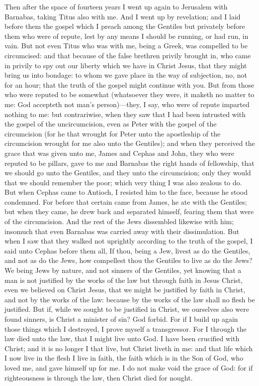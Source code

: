 Then after the space of fourteen years I went up again to Jerusalem with Barnabas, taking Titus also with me. And I went up by revelation; and I laid before them the gospel which I preach among the Gentiles but privately before them who were of repute, lest by any means I should be running, or had run, in vain. But not even Titus who was with me, being a Greek, was compelled to be circumcised: and that because of the false brethren privily brought in, who came in privily to spy out our liberty which we have in Christ Jesus, that they might bring us into bondage: to whom we gave place in the way of subjection, no, not for an hour; that the truth of the gospel might continue with you. But from those who were reputed to be somewhat (whatsoever they were, it maketh no matter to me: God accepteth not man’s person)—they, I say, who were of repute imparted nothing to me: but contrariwise, when they saw that I had been intrusted with the gospel of the uncircumcision, even as Peter with the gospel of the circumcision (for he that wrought for Peter unto the apostleship of the circumcision wrought for me also unto the Gentiles); and when they perceived the grace that was given unto me, James and Cephas and John, they who were reputed to be pillars, gave to me and Barnabas the right hands of fellowship, that we should go unto the Gentiles, and they unto the circumcision; only they would that we should remember the poor; which very thing I was also zealous to do.  But when Cephas came to Antioch, I resisted him to the face, because he stood condemned. For before that certain came from James, he ate with the Gentiles; but when they came, he drew back and separated himself, fearing them that were of the circumcision. And the rest of the Jews dissembled likewise with him; insomuch that even Barnabas was carried away with their dissimulation. But when I saw that they walked not uprightly according to the truth of the gospel, I said unto Cephas before them all, If thou, being a Jew, livest as do the Gentiles, and not as do the Jews, how compellest thou the Gentiles to live as do the Jews? We being Jews by nature, and not sinners of the Gentiles, yet knowing that a man is not justified by the works of the law but through faith in Jesus Christ, even we believed on Christ Jesus, that we might be justified by faith in Christ, and not by the works of the law: because by the works of the law shall no flesh be justified. But if, while we sought to be justified in Christ, we ourselves also were found sinners, is Christ a minister of sin? God forbid. For if I build up again those things which I destroyed, I prove myself a transgressor. For I through the law died unto the law, that I might live unto God. I have been crucified with Christ; and it is no longer I that live, but Christ liveth in me: and that life which I now live in the flesh I live in faith, the faith which is in the Son of God, who loved me, and gave himself up for me. I do not make void the grace of God: for if righteousness is through the law, then Christ died for nought. 

